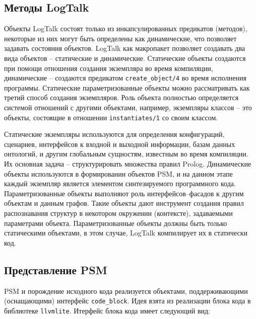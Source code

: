 \documentclass[conference]{IEEEtran} \IEEEoverridecommandlockouts
\begin{document}
\subsection{Методы LogTalk} \label{sec:lgt-methods}

Объекты LogTalk состоят только из инкапсулированных предикатов (методов), некоторые из них могут быть определены как динамические, что позволяет задавать состояния объектов. LogTalk как макропакет позволяет создавать два вида объектов -- статические и динамические. Статические объекты создаются при помощи отношения создания экземпляра во время компиляции, динамические -- создаются предикатом \texttt{create\_object/4} во время исполнения программы. Статические параметризованные объекты можно рассматривать как третий способ создания экземпляров. Роль объекта полностью определяется системой отношений с другими объектами, например, экземпляры классов -- это объекты, состоящие в отношении \verb|instantiates/1| со своим классом.

Статические экземпляры используются для определения конфигураций, сценариев, интерфейсов к входной и выходной информации, базам данных онтологий, и другим глобальным сущностям, известным во время компиляции. Их основная задача -- структурировать множества правил Prolog. Динамические объекты используются в формировании объектов PSM, и на данном этапе каждый экземпляр является элементом синтезируемого программного кода. Параметризованные объекты выполняют роль интерфейсов--фасадов к другим объектам и данным графов. Такие объекты дают инструмент создания правил распознавания структур в некотором окружении (контексте), задаваемыми параметрами объекта. Параметризованные объекты должны быть только статическими объектами, в этом случае, LogTalk компилирует их в статически код.

\subsection{Представление PSM} \label{sec:blocks}

PSM и порождение исходного кода реализуется объектами, поддерживающими (оснащающими) интерфейс \texttt{code\_block}. Идея взята из реализации блока кода в библиотеке \verb|llvmlite|. Итерфейс блока кода имеет следующий вид: %
\end{document}
